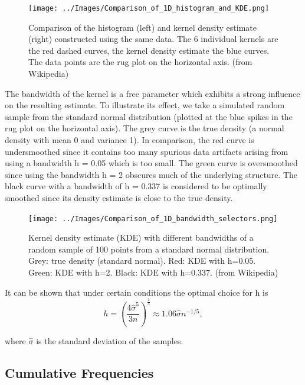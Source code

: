 \begin{figure}[ht]
  \centering
  \texttt{[image: ../Images/Comparison\_of\_1D\_histogram\_and\_KDE.png]}\\
  \caption{Comparison of the histogram (left) and kernel density estimate (right) constructed using the same data. The 6 individual kernels are the red dashed curves, the kernel density estimate the blue curves. The data points are the rug plot on the horizontal axis. (from Wikipedia)}
\end{figure}

The bandwidth of the kernel is a free parameter which exhibits a strong influence on the resulting estimate. To illustrate its effect, we take a simulated random sample from the standard normal distribution (plotted at the blue spikes in the rug plot on the horizontal axis). The grey curve is the true density (a normal density with mean 0 and variance 1). In comparison, the red curve is undersmoothed since it contains too many spurious data artifacts arising from using a bandwidth h = 0.05 which is too small. The green curve is oversmoothed since using the bandwidth h = 2 obscures much of the underlying structure. The black curve with a bandwidth of h = 0.337 is considered to be optimally smoothed since its density estimate is close to the true density.

\begin{figure}[ht]
  \centering
  \texttt{[image: ../Images/Comparison\_of\_1D\_bandwidth\_selectors.png]}\\
  \caption{Kernel density estimate (KDE) with different bandwidths of a random sample of 100 points from a standard normal distribution. Grey: true density (standard normal). Red: KDE with h=0.05. Green: KDE with h=2. Black: KDE with h=0.337. (from Wikipedia)}
\end{figure}

It can be shown that under certain conditions the optimal choice for h is
\begin{equation}
  h = \left(\frac{4\hat{\sigma}^5}{3n}\right)^{\frac{1}{5}} \approx 1.06 \hat{\sigma} n^{-1/5},
\end{equation}


where $\hat{\sigma}$ is the standard deviation of the samples.


\subsection{Cumulative Frequencies}

